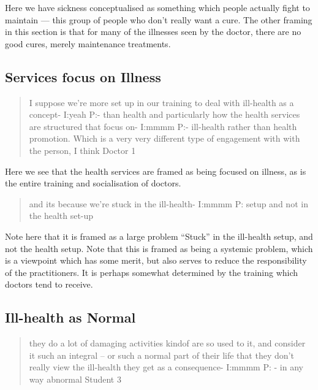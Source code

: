 Here we have sickness conceptualised as something which people actually fight to maintain --- this group of people who don't really want a cure. The other framing in this section is that for many of the illnesses seen by the doctor, there are no good cures, merely maintenance treatments. 


\subsection{Services focus on Illness}
\label{sec:serv-focus-illn}

\begin{quotation}
  I suppose we're more set up in our training to deal with ill-health as a concept-
I:yeah
P:- than health and particularly how the health services are structured that focus on-
I:mmmm
P:- ill-health rather than health promotion. Which is a very very different type of engagement with with the person, I think 
Doctor 1
\end{quotation}

Here we see that the health services are framed as being focused on illness, as is the entire training and socialisation of doctors. 

\begin{quotation}
   and its because we're stuck in the ill-health-
I:mmmm
P: setup and not in the health set-up

\end{quotation}

Note here that it is framed as a large problem ``Stuck'' in the ill-health setup, and not the health setup. Note that this is framed as being a systemic problem, which is a viewpoint which has some merit, but also serves to reduce the responsibility of the practitioners. It is perhaps somewhat determined by the training which doctors tend to receive. 

\subsection{Ill-health as Normal}
\label{sec:illhealth-as-normal}

\begin{quotation}
   they do a lot of damaging activities kindof are so used to it, and consider it such an integral – or such a normal part of their life that they don't really view the ill-health they get as a consequence-
I:mmmm
P: - in any way abnormal
Student 3
\end{quotation}

